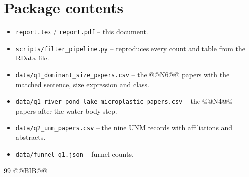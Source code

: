 \documentclass[11pt,a4paper]{article}
\begin{document}
\section{Package contents}
\begin{itemize}
\item \texttt{report.tex} / \texttt{report.pdf} -- this document.
\item \texttt{scripts/filter\_pipeline.py} -- reproduces every count and table from the RData file.
\item \texttt{data/q1\_dominant\_size\_papers.csv} -- the @@N6@@ papers with the matched sentence, size expression and class.
\item \texttt{data/q1\_river\_pond\_lake\_microplastic\_papers.csv} -- the @@N4@@ papers after the water-body step.
\item \texttt{data/q2\_unm\_papers.csv} -- the nine UNM records with affiliations and abstracts.
\item \texttt{data/funnel\_q1.json} -- funnel counts.
\end{itemize}

\begin{thebibliography}{99}\small
@@BIB@@
\end{thebibliography}
\end{document}
